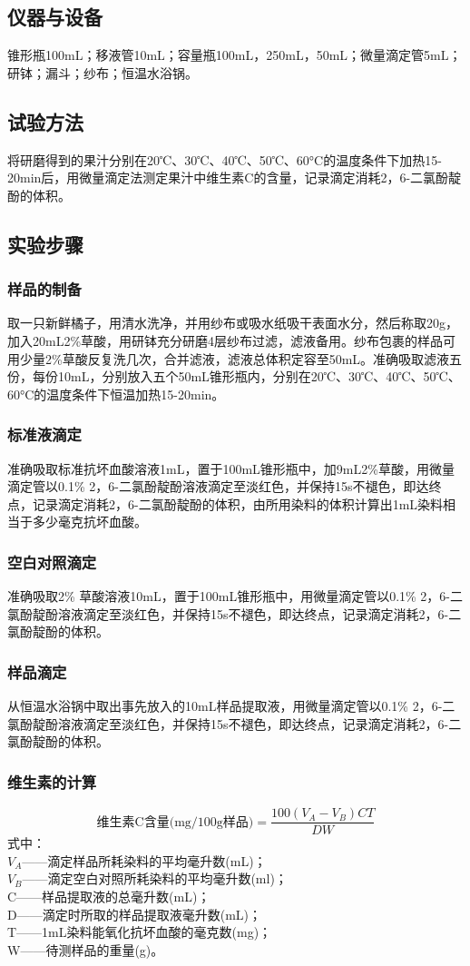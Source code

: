 \documentclass[12pt,hyperref,a4paper,UTF8]{ctexart}
\begin{document}
\subsection{仪器与设备}
锥形瓶100mL；移液管10mL；容量瓶100mL，250mL，50mL；微量滴定管5mL；研钵；漏斗；纱布；恒温水浴锅。
\subsection{试验方法}
将研磨得到的果汁分别在20℃、30℃、40℃、50℃、60°C的温度条件下加热15-20min后，用微量滴定法测定果汁中维生素C的含量，记录滴定消耗2，6-二氯酚靛酚的体积。
\subsection{实验步骤}
\subsubsection{样品的制备}
取一只新鲜橘子，用清水洗净，并用纱布或吸水纸吸干表面水分，然后称取20g，加入20mL2\%草酸，用研钵充分研磨4层纱布过滤，滤液备用。纱布包裹的样品可用少量2\%草酸反复洗几次，合并滤液，滤液总体积定容至50mL。准确吸取滤液五份，每份10mL，分别放入五个50mL锥形瓶内，分别在20℃、30℃、40℃、50℃、60°C的温度条件下恒温加热15-20min。
\subsubsection{标准液滴定}
准确吸取标准抗坏血酸溶液1mL，置于100mL锥形瓶中，加9mL2\%草酸，用微量滴定管以0.1\% 2，6-二氯酚靛酚溶液滴定至淡红色，并保持15s不褪色，即达终点，记录滴定消耗2，6-二氯酚靛酚的体积，由所用染料的体积计算出1mL染料相当于多少毫克抗坏血酸。
\subsubsection{空白对照滴定}
准确吸取2\% 草酸溶液10mL，置于100mL锥形瓶中，用微量滴定管以0.1\% 2，6-二氯酚靛酚溶液滴定至淡红色，并保持15s不褪色，即达终点，记录滴定消耗2，6-二氯酚靛酚的体积。
\subsubsection{样品滴定}
从恒温水浴锅中取出事先放入的10mL样品提取液，用微量滴定管以0.1\% 2，6-二氯酚靛酚溶液滴定至淡红色，并保持15s不褪色，即达终点，记录滴定消耗2，6-二氯酚靛酚的体积。
\subsubsection{维生素的计算}
\[\text{维生素C含量(mg/100g样品)} = \frac{100(V_A - V_B)CT}{DW}\]
式中：\\
$V_A$——滴定样品所耗染料的平均毫升数(mL)；\\
$V_B$——滴定空白对照所耗染料的平均毫升数(ml)；\\
C——样品提取液的总毫升数(mL)；\\
D——滴定时所取的样品提取液毫升数(mL)；\\
T——1mL染料能氧化抗坏血酸的毫克数(mg)；\\
W——待测样品的重量(g)。\\
\end{document}
